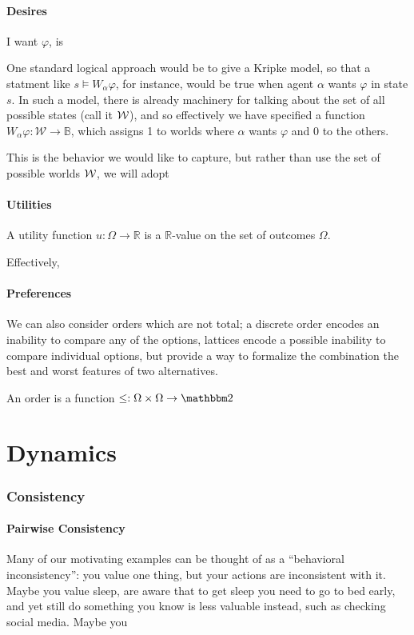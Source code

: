 \documentclass{article}
\begin{document}
	\subsection{Desires}
	
	I want $\varphi$, is 
	
	One standard logical approach would be to give a Kripke model, so that a statment like $s \vDash W_{\alpha} \varphi$, for instance, would be true when agent $\alpha$ wants $\varphi$ in state $s$. In such a model, there is already machinery for talking about the set of all possible states (call it $\cal W$), and so effectively we have specified a function $W_\alpha \varphi: \mathcal W \to \mathbb B$, which assigns 1 to worlds where $\alpha$ wants $\varphi$ and 0 to the others.
	
	This is the behavior we would like to capture, but rather than use the set of possible worlds $\cal W$, we will adopt 
	
	
	\subsection{Utilities}
	
		
	
	A utility function $u : \Omega \to \mathbb R$ is a $\mathbb R$-value on the set of outcomes $\Omega$. 
	
	Effectively, 

	
	\subsection{Preferences}
	We can also consider orders which are not total; a discrete order encodes an inability to compare any of the options, lattices encode a possible inability to compare individual options, but provide a way to formalize the combination the best and worst features of two alternatives.
	
	
	An order is a function $\leq: \Omega \times \Omega \to \mathbbm 2$
	
	\part{Dynamics}
	
	\section{Consistency}
	\subsection{Pairwise Consistency}
	Many of our motivating examples can be thought of as a ``behavioral inconsistency'': you value one thing, but your actions are inconsistent with it. Maybe you value sleep, are aware that to get sleep you need to go to bed early, and yet still do something you know is less valuable instead, such as checking social media. Maybe you 
\end{document}

